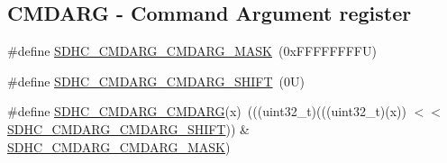 \subsection*{C\+M\+D\+A\+RG -\/ Command Argument register}
\begin{DoxyCompactItemize}
\item 
\#define \mbox{\hyperlink{group___s_d_h_c___register___masks_ga96ab88ba50cc09465c266e3aab2ba3b0}{S\+D\+H\+C\+\_\+\+C\+M\+D\+A\+R\+G\+\_\+\+C\+M\+D\+A\+R\+G\+\_\+\+M\+A\+SK}}~(0x\+F\+F\+F\+F\+F\+F\+F\+F\+U)
\item 
\#define \mbox{\hyperlink{group___s_d_h_c___register___masks_gaa96f4afe969ac51d89ac52df46867f0a}{S\+D\+H\+C\+\_\+\+C\+M\+D\+A\+R\+G\+\_\+\+C\+M\+D\+A\+R\+G\+\_\+\+S\+H\+I\+FT}}~(0\+U)
\item 
\#define \mbox{\hyperlink{group___s_d_h_c___register___masks_ga396ddd22ee6d52bc20fe7838e2832cff}{S\+D\+H\+C\+\_\+\+C\+M\+D\+A\+R\+G\+\_\+\+C\+M\+D\+A\+RG}}(x)~(((uint32\+\_\+t)(((uint32\+\_\+t)(x)) $<$$<$ \mbox{\hyperlink{group___s_d_h_c___register___masks_gaa96f4afe969ac51d89ac52df46867f0a}{S\+D\+H\+C\+\_\+\+C\+M\+D\+A\+R\+G\+\_\+\+C\+M\+D\+A\+R\+G\+\_\+\+S\+H\+I\+FT}})) \& \mbox{\hyperlink{group___s_d_h_c___register___masks_ga96ab88ba50cc09465c266e3aab2ba3b0}{S\+D\+H\+C\+\_\+\+C\+M\+D\+A\+R\+G\+\_\+\+C\+M\+D\+A\+R\+G\+\_\+\+M\+A\+SK}})
\end{DoxyCompactItemize}
